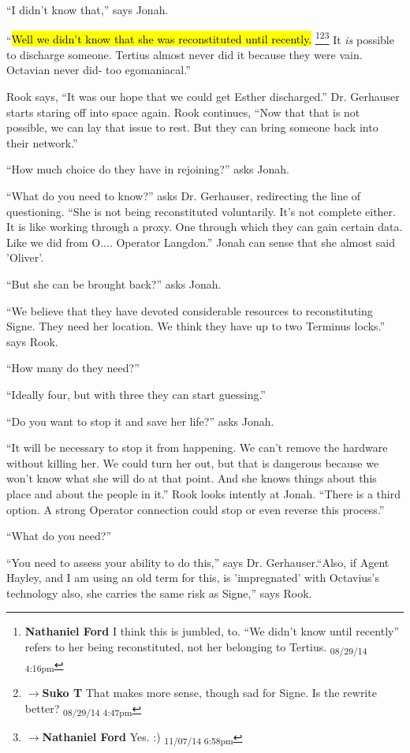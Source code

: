 ``I didn't know that,'' says Jonah.

``\hl{Well we didn't know that she was reconstituted until recently.} \footnote{\textbf{Nathaniel Ford }I think this is jumbled, to. ``We didn't know until recently'' refers to her being reconstituted, not her belonging to Tertius. \textsubscript{08/29/14 4:16pm}}\footnote{$\rightarrow$\textbf{Suko T }That makes more sense, though sad for Signe.  Is the rewrite better? \textsubscript{08/29/14 4:47pm}}\footnote{$\rightarrow$\textbf{Nathaniel Ford }Yes. :) \textsubscript{11/07/14 6:58pm}} It \textit{is} possible to discharge someone.  Tertius almost never did it because they were vain.  Octavian never did- too egomaniacal.''

Rook says, ``It was our hope that we could get Esther discharged.''  Dr. Gerhauser starts staring off into space again.  Rook continues, ``Now that that is not possible, we can lay that issue to rest.  But they can bring someone back into their network.''

``How much choice do they have in rejoining?'' asks Jonah.

``What do you need to know?'' asks Dr. Gerhauser, redirecting the line of questioning.  ``She is not being reconstituted voluntarily.  It's not complete either.  It is like working through a proxy.  One through which they can gain certain data.  Like we did from O.... Operator Langdon.''  Jonah can sense that she almost said 'Oliver'.

``But she can be brought back?'' asks Jonah.

``We believe that they have devoted considerable resources to reconstituting Signe.  They need her location.  We think they have up to two Terminus locks.'' says Rook.

``How many do they need?''

``Ideally four, but with three they can start guessing.''

``Do you want to stop it and save her life?'' asks Jonah.

``It will be necessary to stop it from happening.  We can't remove the hardware without killing her.  We could turn her out, but that is dangerous because we won't know what she will do at that point.  And she knows things about this place and about the people in it.''  Rook looks intently at Jonah.  ``There is a third option.  A strong Operator connection could stop or even reverse this process.''

``What do you need?''

``You need to assess your ability to do this,'' says Dr. Gerhauser.``Also, if Agent Hayley, and I am using an old term for this, is 'impregnated' with Octavius's technology also, she carries the same risk as Signe,'' says Rook.

